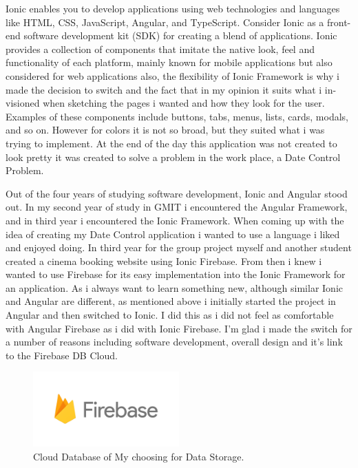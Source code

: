Ionic enables you to develop applications using web technologies and languages like HTML, CSS, JavaScript, Angular, and TypeScript. Consider Ionic as a front-end software development kit (SDK) for creating a blend of applications. Ionic provides a collection of components that imitate the native look, feel and functionality of each platform, mainly known for mobile applications but also considered for web applications also, the flexibility of Ionic Framework is why i made the decision to switch and the fact that in my opinion it suits what i in-visioned when sketching the pages i wanted and how they look for the user. Examples of these components include buttons, tabs, menus, lists, cards, modals, and so on. However for colors it is not so broad, but they suited what i was trying to implement. At the end of the day this application was not created to look pretty it was created to solve a problem in the work place, a Date Control Problem.
\newline

Out of the four years of studying software development, Ionic and Angular stood out. In my second year of study in GMIT i encountered the Angular Framework, and in third year i encountered the Ionic Framework. When coming up with the idea of creating my Date Control application i wanted to use a language i liked and enjoyed doing. In third year for the group project myself and another student created a cinema booking website using Ionic Firebase. From then i knew i wanted to use Firebase for its easy implementation into the Ionic Framework for an application. As i always want to learn something new, although similar Ionic and Angular are different, as mentioned above i initially started the project in Angular and then switched to Ionic. I did this as i did not feel as comfortable with Angular Firebase as i did with Ionic Firebase. I'm glad i made the switch for a number of reasons including software development, overall design and it's link to the Firebase DB Cloud.
\newline

\begin{figure}[h!]
	\caption{Cloud Database of My choosing for Data Storage.}
	\label{image:fire-base}
	\centering
	\includegraphics[width=0.5\textwidth]{images/fire-base.png}
\end{figure}

